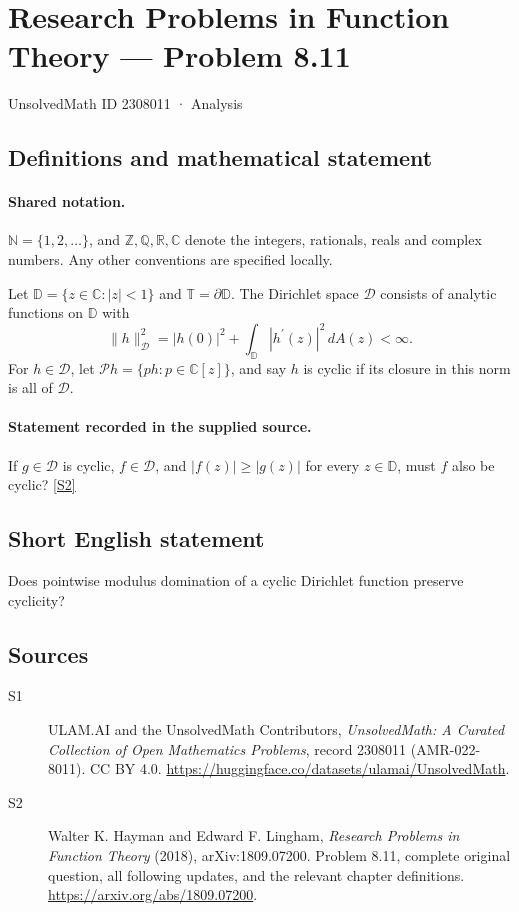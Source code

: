 \documentclass[11pt]{book}
\newcommand{\sref}[2]{\hyperlink{source:#1:#2}{[S#2]}}
\begin{document}
\setcounter{section}{2308010}
\section{Research Problems in Function Theory — Problem 8.11}\label{2308011}
{\small\sffamily UnsolvedMath ID 2308011 · Analysis}
\subsection{Definitions and mathematical statement}

\paragraph{Shared notation.}$\mathbb N=\{1,2,\ldots\}$, and $\mathbb Z,\mathbb Q,\mathbb R,\mathbb C$ denote the integers, rationals, reals and complex numbers. Any other conventions are specified locally.


Let $\mathbb D=\{z\in\mathbb C:|z|<1\}$ and $\mathbb T=\partial\mathbb D$. The Dirichlet space $\mathcal D$ consists of analytic functions on $\mathbb D$ with \[\|h\|_{\mathcal D}^2=|h(0)|^2+\int_{\mathbb D}|h^{\prime}(z)|^2\,dA(z)<\infty.\] For $h\in\mathcal D$, let $\mathcal Ph=\{ph:p\in\mathbb C[z]\}$, and say $h$ is cyclic if its closure in this norm is all of $\mathcal D$.
\paragraph{Statement recorded in the supplied source.}
If $g\in\mathcal D$ is cyclic, $f\in\mathcal D$, and $|f(z)|\ge|g(z)|$ for every $z\in\mathbb D$, must $f$ also be cyclic? \sref{2308011}{2}
\subsection{Short English statement}
Does pointwise modulus domination of a cyclic Dirichlet function preserve cyclicity?
\subsection{Sources}
\begin{description}
\item[\hypertarget{source:2308011:1}{S1}] ULAM.AI and the UnsolvedMath Contributors, \emph{UnsolvedMath: A Curated Collection of Open Mathematics Problems}, record 2308011 (AMR-022-8011). CC BY 4.0. \url{https://huggingface.co/datasets/ulamai/UnsolvedMath}.
\item[\hypertarget{source:2308011:2}{S2}] Walter K. Hayman and Edward F. Lingham, \emph{Research Problems in Function Theory} (2018), arXiv:1809.07200. Problem 8.11, complete original question, all following updates, and the relevant chapter definitions. \url{https://arxiv.org/abs/1809.07200}.
\end{description}
\label{end:2308011}
\end{document}
